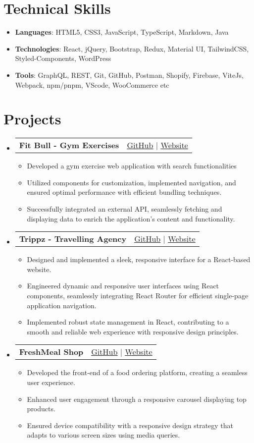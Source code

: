 \documentclass[letterpaper,11pt]{article}
\makeatletter
\newcommand{\resumeItem}[1]{
  \item\small{
    {#1 \vspace{-2pt}}
  }
}
\newcommand{\resumeProjectHeading}[2]{
    \item
    \begin{tabular*}{0.97\textwidth}{l@{\extracolsep{\fill}}r}
      \small#1 & #2 \\
    \end{tabular*}\vspace{-7pt}
}
\newcommand{\resumeSubHeadingListStart}{\begin{itemize}[leftmargin=0.15in, label={}]}
\newcommand{\resumeSubHeadingListEnd}{\end{itemize}}
\newcommand{\resumeItemListStart}{\begin{itemize}}
\newcommand{\resumeItemListEnd}{\end{itemize}\vspace{-5pt}}
\makeatother
\begin{document}
%
\section{Technical Skills}
\resumeItemListStart
            \resumeItem{\textbf{Languages}{: HTML5, CSS3, JavaScript, TypeScript, Markdown, Java}}
            \resumeItem{\textbf{Technologies}{: React, jQuery, Bootstrap, Redux, Material UI, TailwindCSS, Styled-Components, WordPress}}
            \resumeItem{\textbf{Tools}{: GraphQL, REST, Git, GitHub, Postman, Shopify, Firebase, ViteJs, Webpack, npm/pnpm, VScode, WooCommerce etc}}
\resumeItemListEnd


\section{Projects}
    \resumeSubHeadingListStart
        \resumeProjectHeading
          {\textbf{Fit Bull - Gym Exercises}}
          {{ {\small {\faGithub} \href{https://github.com/dushmanta05/fit-bull}{\underline{GitHub}}} $|$ {\small {\faGlobe} \href{https://fit-bull.netlify.app/}{{\underline{Website}}}}}}
          \resumeItemListStart
            \resumeItem{Developed a gym exercise web application with search functionalities}
            \resumeItem{Utilized components for customization, implemented navigation, and ensured optimal performance with efficient bundling techniques.}
            \resumeItem{Successfully integrated an external API, seamlessly fetching and displaying data to enrich the application's content and functionality.}
          \resumeItemListEnd
      \resumeProjectHeading
          {\textbf{Trippz - Travelling Agency}}
          {{ {\small {\faGithub} \href{https://github.com/dushmanta05/trippz}{\underline{GitHub}}} $|$ {\small {\faGlobe} \href{https://trippz.vercel.app/}{{\underline{Website}}}}}}
          \resumeItemListStart
            \resumeItem{Designed and implemented a sleek, responsive interface for a React-based website.}
            \resumeItem{Engineered dynamic and responsive user interfaces using React components, seamlessly integrating React Router for efficient single-page application navigation.}
            \resumeItem{Implemented robust state management in React, contributing to a smooth and reliable web experience with responsive design principles.}
          \resumeItemListEnd
          \resumeProjectHeading
          {\textbf{FreshMeal Shop}}
          {{ {\small {\faGithub} \href{https://github.com/dushmanta05/fresh-kart}{\underline{GitHub}}} $|$ {\small {\faGlobe} \href{https://fresh-kart.vercel.app/}{{\underline{Website}}}}}}
          \resumeItemListStart
            \resumeItem{Developed the front-end of a food ordering platform, creating a seamless user experience.}
            \resumeItem{Enhanced user engagement through a responsive carousel displaying top products.}
            \resumeItem{ Ensured device compatibility with a responsive design strategy that adapts to various screen sizes using media queries.}
          \resumeItemListEnd
    \resumeSubHeadingListEnd
\end{document}
